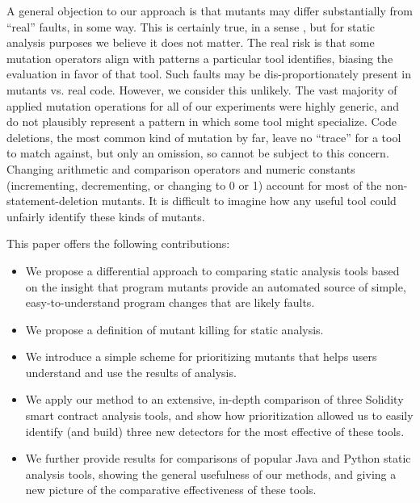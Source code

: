 A general objection to our approach is that mutants may differ substantially from ``real'' faults, in some way.  This is certainly true, in a sense \cite{GopinathMutants}, but for static analysis purposes we believe it does not matter.   The real risk is that some mutation operators align with patterns a particular tool identifies, biasing the evaluation in favor of that tool.  Such faults may be dis-proportionately present in mutants vs. real code.  However, we consider this unlikely.  The vast majority of applied mutation operations for all of our experiments were highly generic, and do not plausibly represent a pattern in which some tool might specialize.  Code deletions, the most common kind of mutation by far, leave no ``trace'' for a tool to match against, but only an omission, so cannot be subject to this concern.  Changing arithmetic and comparison operators and numeric constants (incrementing, decrementing, or changing to 0 or 1) account for most of the non-statement-deletion mutants.  It is difficult to imagine how any useful tool could unfairly identify these kinds of mutants.


This paper offers the following contributions:

\begin{itemize}[labelsep=3pt,leftmargin=12pt]
\item We propose a differential approach to comparing static analysis tools based on the insight that program mutants provide an automated source of simple, easy-to-understand program changes that are likely faults.
\item We propose a definition of mutant killing for static analysis.
\item We introduce a simple scheme for prioritizing mutants that helps users understand and use the results of analysis.
\item We apply our method to an extensive, in-depth comparison of three Solidity smart contract analysis tools, and show how prioritization allowed us to easily identify (and build) three new detectors for the most effective of these tools.
\item We further provide results for comparisons of popular Java and Python static analysis tools, showing the general usefulness of our methods, and giving a new picture of the comparative effectiveness of these tools.
\end{itemize}


